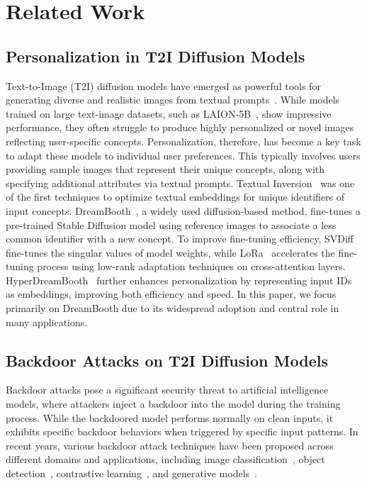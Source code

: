 \section{Related Work}
\subsection{Personalization in T2I Diffusion Models}
Text-to-Image (T2I) diffusion models have emerged as powerful tools for generating diverse and realistic images from textual prompts~\cite{saharia2022photorealistic, rombach2022high, nichol2021glide, balaji2022ediff, ramesh2022hierarchical}. While models trained on large text-image datasets, such as LAION-5B~\cite{schuhmann2022laion}, show impressive performance, they often struggle to produce highly personalized or novel images reflecting user-specific concepts. Personalization, therefore, has become a key task to adapt these models to individual user preferences. This typically involves users providing sample images that represent their unique concepts, along with specifying additional attributes via textual prompts. Textual Inversion~\cite{galimage} was one of the first techniques to optimize textual embeddings for unique identifiers of input concepts. DreamBooth~\cite{ruiz2023dreambooth}, a widely used diffusion-based method, fine-tunes a pre-trained Stable Diffusion model using reference images to associate a less common identifier with a new concept. To improve fine-tuning efficiency, SVDiff~\cite{han2023svdiff} fine-tunes the singular values of model weights, while LoRa~\cite{hu2021lora} accelerates the fine-tuning process using low-rank adaptation techniques on cross-attention layers. HyperDreamBooth~\cite{ruiz2024hyperdreambooth} further enhances personalization by representing input IDs as embeddings, improving both efficiency and speed. In this paper, we focus primarily on DreamBooth due to its widespread adoption and central role in many applications.


\subsection{Backdoor Attacks on T2I Diffusion Models}
Backdoor attacks pose a significant security threat to artificial intelligence models, where attackers inject a backdoor into the model during the training process. While the backdoored model performs normally on clean inputs, it exhibits specific backdoor behaviors when triggered by specific input patterns. In recent years, various backdoor attack techniques have been proposed across different domains and applications, including image classification~\cite{gu2019badnets,chen2017targeted}, object detection~\cite{chan2022baddet,luo2023untargeted}, contrastive learning~\cite{carlini2021poisoning,liang2024badclip}, and generative models~\cite{salem2020baaan}.

